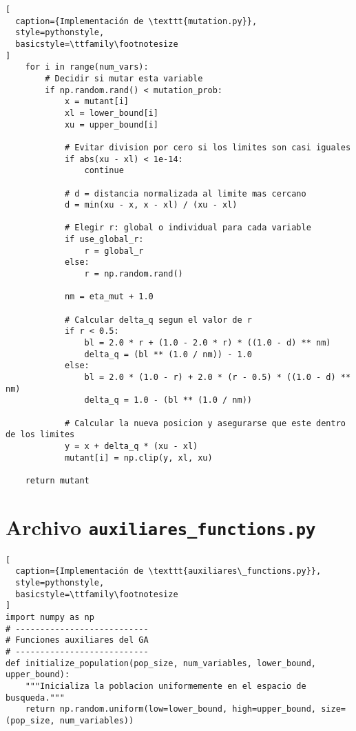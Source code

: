 \begin{lstlisting}[
  caption={Implementación de \texttt{mutation.py}},
  style=pythonstyle,
  basicstyle=\ttfamily\footnotesize
]
    for i in range(num_vars):
        # Decidir si mutar esta variable
        if np.random.rand() < mutation_prob:
            x = mutant[i]
            xl = lower_bound[i]
            xu = upper_bound[i]
            
            # Evitar division por cero si los limites son casi iguales
            if abs(xu - xl) < 1e-14:
                continue

            # d = distancia normalizada al limite mas cercano
            d = min(xu - x, x - xl) / (xu - xl)
            
            # Elegir r: global o individual para cada variable
            if use_global_r:
                r = global_r
            else:
                r = np.random.rand()

            nm = eta_mut + 1.0

            # Calcular delta_q segun el valor de r
            if r < 0.5:
                bl = 2.0 * r + (1.0 - 2.0 * r) * ((1.0 - d) ** nm)
                delta_q = (bl ** (1.0 / nm)) - 1.0
            else:
                bl = 2.0 * (1.0 - r) + 2.0 * (r - 0.5) * ((1.0 - d) ** nm)
                delta_q = 1.0 - (bl ** (1.0 / nm))
            
            # Calcular la nueva posicion y asegurarse que este dentro de los limites
            y = x + delta_q * (xu - xl)
            mutant[i] = np.clip(y, xl, xu)
    
    return mutant
\end{lstlisting}

\section{Archivo \texttt{auxiliares\_functions.py}}
\begin{lstlisting}[
  caption={Implementación de \texttt{auxiliares\_functions.py}},
  style=pythonstyle,
  basicstyle=\ttfamily\footnotesize
]
import numpy as np
# ---------------------------
# Funciones auxiliares del GA
# ---------------------------
def initialize_population(pop_size, num_variables, lower_bound, upper_bound):
    """Inicializa la poblacion uniformemente en el espacio de busqueda."""
    return np.random.uniform(low=lower_bound, high=upper_bound, size=(pop_size, num_variables))
\end{lstlisting}